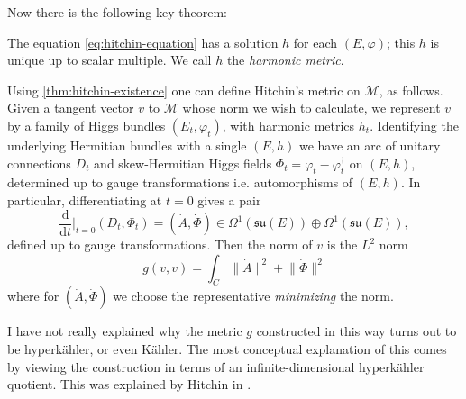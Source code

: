 \documentclass[12pt,letterpaper,reqno]{article}
\numberwithin{equation}{section}
\newcommand{\fsu}{{\mathfrak{su}}}
\newcommand{\cM}{\ensuremath{\mathcal M}}
\newcommand{\kahler}{K\"ahler\xspace}
\newcommand{\hk}{hyperk\"ahler\xspace}
\newcommand{\Hk}{Hyperk\"ahler\xspace}
\newcommand{\de}{\mathrm{d}}
\newcommand{\norm}[1]{\lVert#1\rVert}
\newcommand{\ti}[1]{\textit{#1}}
\begin{document}
Now there is the following key theorem:
\begin{thm} \label{thm:hitchin-existence}
The equation \eqref{eq:hitchin-equation} has a solution $h$ for each $(E,\varphi)$;
this $h$ is unique up to scalar multiple.
We call $h$ the \ti{harmonic metric}.
\end{thm}

Using \autoref{thm:hitchin-existence}
one can define Hitchin's metric on $\cM$, as follows.
Given a tangent vector $v$ to $\cM$ whose norm we wish to calculate, we represent $v$ by a family of Higgs bundles
$(E_t,\varphi_t)$, with harmonic metrics $h_t$.
Identifying the underlying Hermitian bundles with a single $(E,h)$
we have an arc of unitary connections $D_t$ and skew-Hermitian 
Higgs fields $\Phi_t = \varphi_t - \varphi_t^\dagger$ 
on $(E,h)$, determined up to gauge transformations i.e. 
automorphisms of $(E,h)$.
In particular, differentiating at $t = 0$ gives a pair
\begin{equation}
\frac{\de}{\de t}\Bigg\rvert_{t=0} (D_t, \Phi_t) = 
(\dot A, \dot \Phi) \in \Omega^1(\fsu(E)) \oplus \Omega^{1}(\fsu(E)),
\end{equation}
defined up to gauge transformations.
Then the norm of $v$ is the $L^2$ norm
\begin{equation} \label{eq:l2-metric-def}
  g(v,v) = \int_C \norm{\dot A}^2 + \norm{\dot \Phi}^2
\end{equation}
where for $(\dot A, \dot \Phi)$ we choose the representative
\ti{minimizing} the norm.

\begin{remark}[\Hk quotient] I have not really explained
why the metric $g$ constructed in this way turns out to 
be \hk, or even \kahler. The most conceptual explanation
of this comes by viewing the construction in terms of 
an infinite-dimensional \hk quotient.
This was explained by
Hitchin in \cite{MR89a:32021}.

\end{remark}

\end{document}
